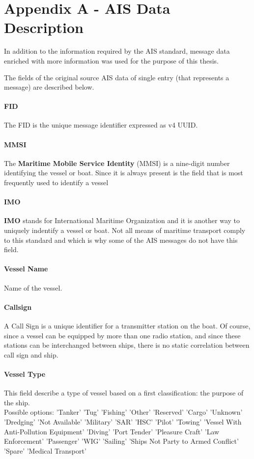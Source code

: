 \chapter{Appendix A - AIS Data Description}

In addition to the information required by the AIS standard, message data enriched with more information was used for the purpose of this thesis.
    
The fields of the original source AIS data of single entry (that represents a message) are described below.

\subsubsection{FID}
    The FID is the unique message identifier expressed as v4 UUID.
\subsubsection{MMSI}
    The \textbf{Maritime Mobile Service Identity} (MMSI) is a nine-digit number identifying the vessel or boat. Since it is always present is the field that is most frequently used to identify a vessel
\subsubsection{IMO}
    \textbf{IMO} stands for International Maritime Organization and it is another way to uniquely indentify a vessel or boat. Not all means of maritime transport comply to this standard and which is why some of the AIS messages do not have this field.
\subsubsection{Vessel Name}
    Name of the vessel.
\subsubsection{Callsign}
    A Call Sign is a unique identifier for a transmitter station on the boat. Of course, since a vessel can be equipped by more than one radio station, and since these stations can be interchanged between ships, there is no static correlation between call sign and ship.
\subsubsection{Vessel Type}
    This field describe a type of vessel based on a first classification: the purpose of the ship. \\
    Possible options: 'Tanker' 'Tug' 'Fishing' 'Other' 'Reserved' 'Cargo' 'Unknown' 'Dredging' 'Not Available' 'Military' 'SAR' 'HSC' 'Pilot' 'Towing' 'Vessel With Anti-Pollution Equipment' 'Diving' 'Port Tender' 'Pleasure Craft' 'Law Enforcement' 'Passenger' 'WIG' 'Sailing' 'Ships Not Party to Armed Conflict' 'Spare' 'Medical Transport'
